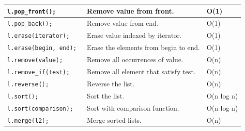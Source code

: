 \documentclass[12 pt, twoside] {article}
\begin{document}
{\begin{table}[h]
\begin{tabular}{|l|l|l|}
\texttt{l.pop\_front();            }               & Remove value from front.                           & O(1)       \\ \hline
\texttt{l.pop\_back();             }               & Remove value from end.                             & O(1)       \\ \hline
\texttt{l.erase(iterator);         }               & Erase value indexed by iterator.                   & O(1)       \\ \hline
\texttt{l.erase(begin, end);       }               & Erase the elements from begin to end.              & O(1)       \\ \hline
\texttt{l.remove(value);           }               & Remove all occurrences of value.                   & O(n)       \\ \hline
\texttt{l.remove\_if(test);        }               & Remove all element that satisfy test.              & O(n)       \\ \hline
\texttt{l.reverse();               }               & Reverse the list.                                  & O(n)       \\ \hline
\texttt{l.sort();                  }               & Sort the list.                                     & O(n log n) \\ \hline
\texttt{l.sort(comparison);        }               & Sort with comparison function.                     & O(n log n)  \\ \hline
\texttt{l.merge(l2);               }               & Merge sorted lists.                                & O(n)       \\ \hline
\end{tabular}
\end{table}
}
\end{document}
